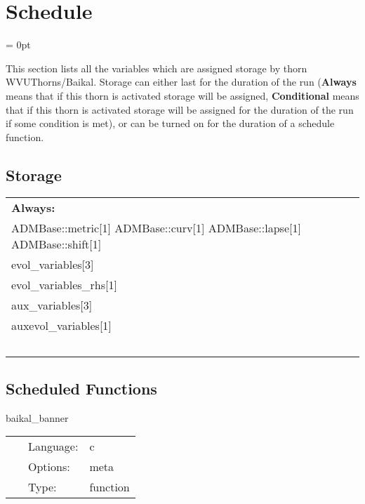 
\section{Schedule} 


\parskip = 0pt


\noindent This section lists all the variables which are assigned storage by thorn WVUThorns/Baikal.  Storage can either last for the duration of the run ({\bf Always} means that if this thorn is activated storage will be assigned, {\bf Conditional} means that if this thorn is activated storage will be assigned for the duration of the run if some condition is met), or can be turned on for the duration of a schedule function.


\subsection*{Storage}

\hspace{5mm}

 \begin{tabular*}{160mm}{ll} 

{\bf Always:}&  ~ \\ 
 ADMBase::metric[1] ADMBase::curv[1] ADMBase::lapse[1] ADMBase::shift[1] & ~\\ 
 evol\_variables[3] & ~\\ 
 evol\_variables\_rhs[1] & ~\\ 
 aux\_variables[3] & ~\\ 
 auxevol\_variables[1] & ~\\ 
~ & ~\\ 
\end{tabular*} 


\subsection*{Scheduled Functions}
\vspace{5mm}


\hspace{5mm} baikal\_banner 

\hspace{5mm}{\it output ascii art banner } 


\hspace{5mm}

 \begin{tabular*}{160mm}{cll} 
~ & Language:  & c \\ 
~ & Options:  & meta \\ 
~ & Type:  & function \\ 
\end{tabular*} 


